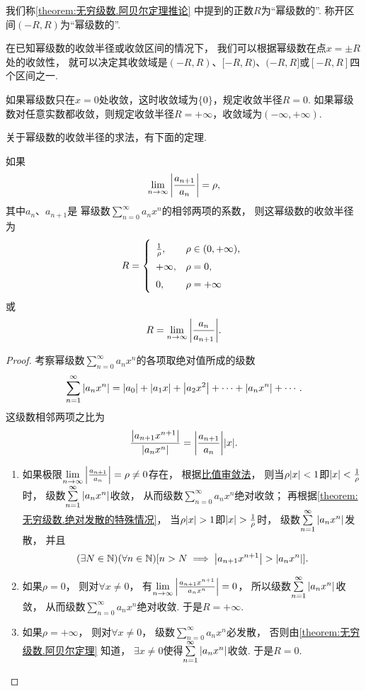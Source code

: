 我们称\cref{theorem:无穷级数.阿贝尔定理推论} 中提到的正数\(R\)为“幂级数的”.
称开区间\((-R,R)\)为“幂级数的”.

在已知幂级数的收敛半径或收敛区间的情况下，
我们可以根据幂级数在点\(x = \pm R\)处的收敛性，
就可以决定其收敛域是\((-R,R)\)、\([-R,R)\)、\((-R,R]\)或\([-R,R]\)四个区间之一.

如果幂级数只在\(x=0\)处收敛，这时收敛域为\(\{0\}\)，规定收敛半径\(R=0\).
如果幂级数对任意实数都收敛，则规定收敛半径\(R=+\infty\)，收敛域为\((-\infty,+\infty)\).

关于幂级数的收敛半径的求法，有下面的定理.
\begin{theorem}\label{theorem:无穷级数.幂级数的收敛半径的求法}
如果\[
	\lim\limits_{n\to\infty} \abs{\frac{a_{n+1}}{a_n}} = \rho,
\]
其中\(a_n\)、\(a_{n+1}\)是
幂级数\(\sum\limits_{n=0}^\infty a_n x^n\)的相邻两项的系数，
则这幂级数的收敛半径为\[
	R = \left\{ \def\arraystretch{1.5} \begin{array}{ll}
		\frac{1}{\rho}, & \rho \in (0,+\infty), \\
		+\infty, & \rho = 0, \\
		0, & \rho = +\infty \\
	\end{array} \right.
\]或\[
	R = \lim\limits_{n\to\infty} \abs{\frac{a_n}{a_{n+1}}}.
\]
\begin{proof}
考察幂级数\(\sum\limits_{n=0}^\infty a_n x^n\)的各项取绝对值所成的级数\[
	\sum\limits_{n=1}^\infty \abs{a_n x^n}
	= \abs{a_0} + \abs{a_1 x} + \abs{a_2 x^2} + \dotsb + \abs{a_n x^n} + \dotsb.
\]
这级数相邻两项之比为\[
	\frac{\abs{a_{n+1} x^{n+1}}}{\abs{a_n x^n}}
	= \abs{\frac{a_{n+1}}{a_n}} \abs{x}.
\]

\begin{enumerate}
	\item 如果极限\(\lim\limits_{n\to\infty} \abs{\frac{a_{n+1}}{a_n}} = \rho\neq0\)存在，
	根据\hyperref[theorem:无穷级数.正项级数的比值审敛法]{比值审敛法}，
	则当\(\rho \abs{x} < 1\)即\(\abs{x} < \frac{1}{\rho}\)时，
	级数\(\sum\limits_{n=1}^\infty \abs{a_n x^n}\)收敛，
	从而级数\(\sum\limits_{n=0}^\infty a_n x^n\)绝对收敛；
	再根据\cref{theorem:无穷级数.绝对发散的特殊情况}，
	当\(\rho \abs{x} > 1\)即\(\abs{x} > \frac{1}{\rho}\)时，
	级数\(\sum\limits_{n=1}^\infty \abs{a_n x^n}\)发散，
	并且\[
		(\exists N\in\mathbb{N})
		(\forall n\in\mathbb{N})
		[
			n > N
			\implies
			\abs{a_{n+1} x^{n+1}} > \abs{a_n x^n}
		].
	\]

	\item 如果\(\rho=0\)，
	则对\(\forall x\neq0\)，
	有\(\lim\limits_{n\to\infty} \abs{\frac{a_{n+1} x^{n+1}}{a_n x^n}} = 0\)，
	所以级数\(\sum\limits_{n=1}^\infty \abs{a_n x^n}\)收敛，
	从而级数\(\sum\limits_{n=0}^\infty a_n x^n\)绝对收敛.
	于是\(R=+\infty\).
		\item 如果\(\rho=+\infty\)，
	则对\(\forall x\neq0\)，
	级数\(\sum\limits_{n=0}^\infty a_n x^n\)必发散，
	否则由\cref{theorem:无穷级数.阿贝尔定理} 知道，
	\(\exists x\neq0\)使得\(\sum\limits_{n=1}^\infty \abs{a_n x^n}\)收敛.
	于是\(R=0\).
	\qedhere
\end{enumerate}
\end{proof}
\end{theorem}

